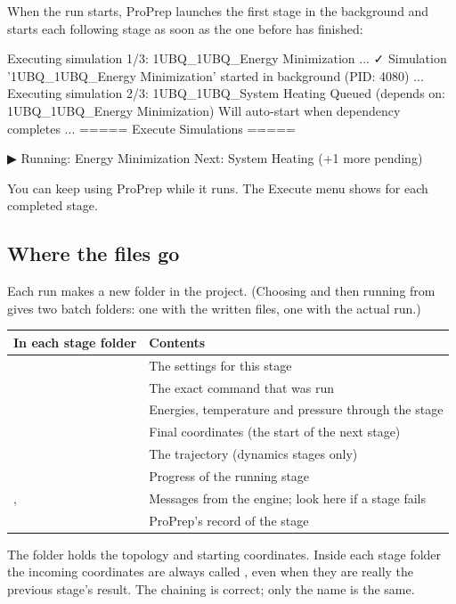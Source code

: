 When the run starts, ProPrep launches the first stage in the background and
starts each following stage as soon as the one before has finished:

\begin{screen}
Executing simulation 1/3: 1UBQ_1UBQ_Energy Minimization
...
✓ Simulation '1UBQ_1UBQ_Energy Minimization' started in background (PID: 4080)
...
Executing simulation 2/3: 1UBQ_1UBQ_System Heating
  Queued (depends on: 1UBQ_1UBQ_Energy Minimization)
Will auto-start when dependency completes
...
===== Execute Simulations =====

▶ Running: Energy Minimization
   Next: System Heating (+1 more pending)
\end{screen}

You can keep using ProPrep while it runs. The Execute menu shows
 for each completed stage.

\subsection{Where the files go}

Each run makes a new folder  in the
project. (Choosing  and then running from   gives two
batch folders: one with the written files, one with the actual run.)

\begin{tabularx}{\linewidth}{@{}lL@{}}
\toprule
\textbf{In each stage folder} & \textbf{Contents} \\
\midrule
{} & The settings for this stage \\
 & The exact command that was run \\
 & Energies, temperature and pressure through the stage \\
 & Final coordinates (the start of the next stage) \\
 & The trajectory (dynamics stages only) \\
 & Progress of the running stage \\
,  & Messages from the engine; look here if a stage fails \\
 & ProPrep's record of the stage \\
\bottomrule
\end{tabularx}

\medskip
The  folder holds the topology and starting coordinates. Inside
each stage folder the incoming coordinates are always called
, even when they are really the previous stage's result.
The chaining is correct; only the name is the same.

